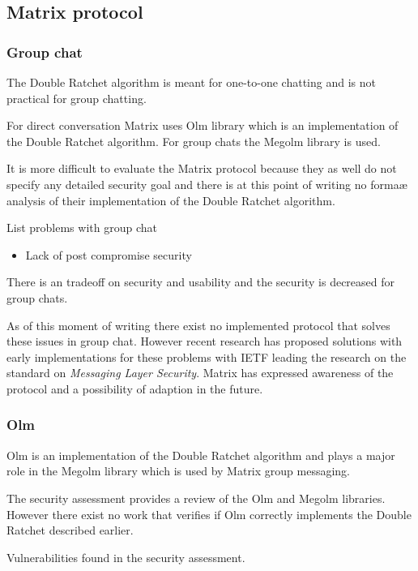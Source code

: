 \subsection{Matrix protocol}



\subsubsection{Group chat}
The Double Ratchet algorithm is meant for one-to-one chatting and is not practical for group chatting. %

For direct conversation Matrix uses Olm library which is an implementation of the Double Ratchet algorithm. For group chats the Megolm library is used. 

It is more difficult to evaluate the Matrix protocol because they as well do not specify any detailed security goal and there is at this point of writing no formaæ analysis of their implementation of the Double Ratchet algorithm.


List problems with group chat 

\begin{itemize}
	\item Lack of post compromise security
\end{itemize}

There is an tradeoff on security and usability and the security is decreased for group chats. %

As of this moment of writing there exist no implemented protocol that solves these issues in group chat. However recent research has proposed solutions with early implementations for these problems with IETF leading the research on the standard on \emph{Messaging Layer Security}. Matrix has expressed awareness of the protocol and a possibility of adaption in the future.

\subsubsection{Olm}
Olm is an implementation of the Double Ratchet algorithm and plays a major role in the Megolm library which is used by Matrix group messaging. 

The security assessment provides a review of the Olm and Megolm libraries. However there exist no work that verifies if Olm correctly implements the Double Ratchet described earlier.

Vulnerabilities found in the security assessment. 

